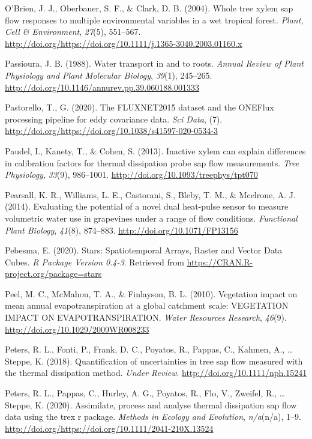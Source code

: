 \documentclass[11pt,twoside]{reedthesis}
\begin{document}
\hypertarget{ref-Obrien2004}{}
O'Brien, J. J., Oberbauer, S. F., \& Clark, D. B. (2004). Whole tree
xylem sap flow responses to multiple environmental variables in a wet
tropical forest. \emph{Plant, Cell \& Environment}, \emph{27}(5),
551--567.
\url{http://doi.org/https://doi.org/10.1111/j.1365-3040.2003.01160.x}

\hypertarget{ref-Passioura1988}{}
Passioura, J. B. (1988). Water transport in and to roots. \emph{Annual
Review of Plant Physiology and Plant Molecular Biology}, \emph{39}(1),
245--265. \url{http://doi.org/10.1146/annurev.pp.39.060188.001333}

\hypertarget{ref-Pastorello2020}{}
Pastorello, T., G. (2020). The FLUXNET2015 dataset and the ONEFlux
processing pipeline for eddy covariance data. \emph{Sci Data}, (7).
\url{http://doi.org/https://doi.org/10.1038/s41597-020-0534-3}

\hypertarget{ref-Paudel2013}{}
Paudel, I., Kanety, T., \& Cohen, S. (2013). Inactive xylem can explain
differences in calibration factors for thermal dissipation probe sap
flow measurements. \emph{Tree Physiology}, \emph{33}(9), 986--1001.
\url{http://doi.org/10.1093/treephys/tpt070}

\hypertarget{ref-Pearsall2014}{}
Pearsall, K. R., Williams, L. E., Castorani, S., Bleby, T. M., \&
Mcelrone, A. J. (2014). Evaluating the potential of a novel dual
heat-pulse sensor to measure volumetric water use in grapevines under a
range of flow conditions. \emph{Functional Plant Biology}, \emph{41}(8),
874--883. \url{http://doi.org/10.1071/FP13156}

\hypertarget{ref-pebesma_stars_2020}{}
Pebesma, E. (2020). Stars: Spatiotemporal Arrays, Raster and Vector Data
Cubes. \emph{R Package Version 0.4-3}. Retrieved from
\url{https://CRAN.R-project.org/package=stars}

\hypertarget{ref-peel_vegetation_2010}{}
Peel, M. C., McMahon, T. A., \& Finlayson, B. L. (2010). Vegetation
impact on mean annual evapotranspiration at a global catchment scale:
VEGETATION IMPACT ON EVAPOTRANSPIRATION. \emph{Water Resources
Research}, \emph{46}(9). \url{http://doi.org/10.1029/2009WR008233}

\hypertarget{ref-Peters2018}{}
Peters, R. L., Fonti, P., Frank, D. C., Poyatos, R., Pappas, C., Kahmen,
A., \ldots{} Steppe, K. (2018). Quantification of uncertainties in tree
sap flow measured with the thermal dissipation method. \emph{Under
Review}. \url{http://doi.org/10.1111/nph.15241}

\hypertarget{ref-Richard2020}{}
Peters, R. L., Pappas, C., Hurley, A. G., Poyatos, R., Flo, V., Zweifel,
R., \ldots{} Steppe, K. (2020). Assimilate, process and analyse thermal
dissipation sap flow data using the trex r package. \emph{Methods in
Ecology and Evolution}, \emph{n/a}(n/a), 1--9.
\url{http://doi.org/https://doi.org/10.1111/2041-210X.13524}
\end{document}
